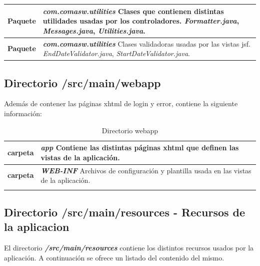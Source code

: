 \begin{longtable}{m{3cm} m{12cm}}
	\textbf{Paquete} & \textit{\textbf{com.comasw.utilities}} \newline
     Clases que contienen distintas utilidades usadas por los controladores.\newline
\textit{Formatter.java},
\textit{Messages.java},
\textit{Utilities.java}.
	\\\hline


	\textbf{Paquete} & \textit{\textbf{com.comasw.utilities}} \newline
     Clases validadoras usadas por las vistas \acrshort{jsf}.\newline
\textit{EndDateValidator.java},
\textit{StartDateValidator.java}.
	\\\hline


\end{longtable}

 


\subsection{Directorio /src/main/webapp}
\label{sub:web}
Además de contener las páginas \acrshort{xhtml} de login y error, contiene la siguiente información:


\begin{longtable}{m{3cm} m{12cm}}
    \caption{Directorio webapp}
    \label{tab:web}\\  	
    \rowcolors{2}{white}{white}
    \textbf{carpeta} & \textit{\textbf{app}} \newline
    Contiene las distintas páginas \acrshort{xhtml} que definen las vistas de la aplicación.
    \\\hline
    \textbf{carpeta} & \textit{\textbf{WEB-INF}} \newline
    Archivos de configuración y plantilla usada en las vistas de la aplicación.
	\\\hline
\\\hline

\end{longtable}    
 


\subsection{Directorio /src/main/resources - Recursos de la aplicacion}
\label{sub:recursos}
El directorio \textit{\textbf{/src/main/resources}} contiene los distintos recursos usados por la aplicación. A continuación se ofrece un listado del contenido del mismo.


